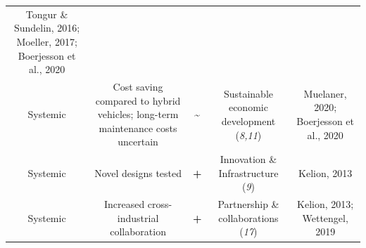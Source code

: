 \documentclass[
]{book}
\begin{document}
\begin{longtable}[]{@{}ccccc@{}}
\begin{minipage}[t]{0.17\columnwidth}
Tongur \& Sundelin, 2016; Moeller, 2017; Boerjesson et al., 2020\strut
\end{minipage}\tabularnewline
\begin{minipage}[t]{0.17\columnwidth}\centering
Systemic\strut
\end{minipage} & \begin{minipage}[t]{0.16\columnwidth}\centering
Cost saving compared to hybrid vehicles; long-term maintenance costs uncertain\strut
\end{minipage} & \begin{minipage}[t]{0.17\columnwidth}\centering
\textbf{\textasciitilde{}}\strut
\end{minipage} & \begin{minipage}[t]{0.17\columnwidth}\centering
Sustainable economic development (\emph{8,11})\strut
\end{minipage} & \begin{minipage}[t]{0.17\columnwidth}\centering
Muelaner, 2020; Boerjesson et al., 2020\strut
\end{minipage}\tabularnewline
\begin{minipage}[t]{0.17\columnwidth}\centering
Systemic\strut
\end{minipage} & \begin{minipage}[t]{0.16\columnwidth}\centering
Novel designs tested\strut
\end{minipage} & \begin{minipage}[t]{0.17\columnwidth}\centering
\textbf{+}\strut
\end{minipage} & \begin{minipage}[t]{0.17\columnwidth}\centering
Innovation \& Infrastructure (\emph{9})\strut
\end{minipage} & \begin{minipage}[t]{0.17\columnwidth}\centering
Kelion, 2013\strut
\end{minipage}\tabularnewline
\begin{minipage}[t]{0.17\columnwidth}\centering
Systemic\strut
\end{minipage} & \begin{minipage}[t]{0.16\columnwidth}\centering
Increased cross-industrial collaboration\strut
\end{minipage} & \begin{minipage}[t]{0.17\columnwidth}\centering
\textbf{+}\strut
\end{minipage} & \begin{minipage}[t]{0.17\columnwidth}\centering
Partnership \& collaborations (\emph{17})\strut
\end{minipage} & \begin{minipage}[t]{0.17\columnwidth}\centering
Kelion, 2013; Wettengel, 2019\strut
\end{minipage}\tabularnewline
\bottomrule
\end{longtable}
\end{document}
